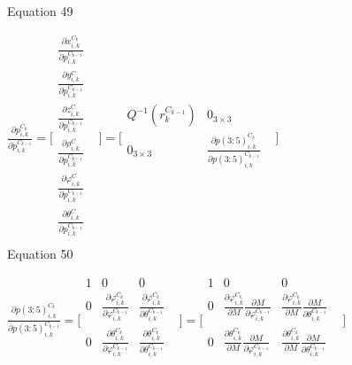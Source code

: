 Equation 49

$\frac{\partial p_{i,k}^{C_{k }}}{\partial p_{i,k}^{C_{k-1 }}}=\lbrack 
\begin{matrix}
\frac{\partial x_{i,k}^{C_{k}}}{\partial p_{i,k}^{C_{k-1 }}} & \\
\frac{\partial y_{i,k}^{C}}{\partial p_{i,k}^{C_{k-1 }}} & \\
\frac{\partial z_{i,k}^{C}}{\partial p_{i,k}^{C_{k-1 }}} & \\
\frac{\partial \rho _{i,k}^{C}}{\partial p_{i,k}^{C_{k-1 }}} & \\
\frac{\partial \varphi _{i, k}^{C}}{\partial p_{i,k}^{C_{k-1 }}} & \\
\frac{\partial \theta _{i, k}^{C}}{\partial p_{i,k}^{C_{k-1 }}} & \\
\end{matrix}
\rbrack =\lbrack \begin{matrix}
Q^{-1}(r_{k}^{C_{k-1}}) & 0_{3\times 3} & \\
0_{3\times 3} & \frac{\partial p(3:5)_{i,k}^{C_{k}}}{\partial 
p(3:5)_{i,k}^{C_{k-1}}} & \\
\end{matrix}
\rbrack $\\


Equation 50



$\frac{\partial p(3:5)_{i,k}^{C_{k}}}{\partial 
p(3:5)_{i,k}^{C_{k-1}}}=\lbrack \begin{matrix}
1 & 0 & 0 & \\
0 & \frac{\partial \varphi _{i, k}^{C_{k}}}{\partial \varphi _{i, 
k}^{C_{k-1}}} & \frac{\partial \varphi _{i, k}^{C_{k}}}{\partial \theta 
_{i, k}^{C_{k-1}}} & \\
0 & \frac{\partial \theta _{i, k}^{C_{k}}}{\partial \varphi _{i, 
k}^{C_{k-1}}} & \frac{\partial \theta _{i, k}^{C_{k}}}{\partial \theta 
_{i, k}^{C_{k-1}}} & \\
\end{matrix}
\rbrack =\lbrack \begin{matrix}
1 & 0 & 0 & \\
0 & \frac{\partial \varphi _{i, k}^{C_{k}}}{\partial M}\frac{\partial 
M}{\partial \varphi _{i, k}^{C_{k-1}}} & \frac{\partial \varphi _{i, 
k}^{C_{k}}}{\partial M}\frac{\partial M}{\partial \theta _{i, 
k}^{C_{k-1}}} & \\
0 & \frac{\partial \theta _{i, k}^{C_{k}}}{\partial M}\frac{\partial 
M}{\partial \varphi _{i, k}^{C_{k-1}}} & \frac{\partial \theta _{i, 
k}^{C_{k}}}{\partial M}\frac{\partial M}{\partial \theta _{i, 
k}^{C_{k-1}}} & \\
\end{matrix}
\rbrack $\\


